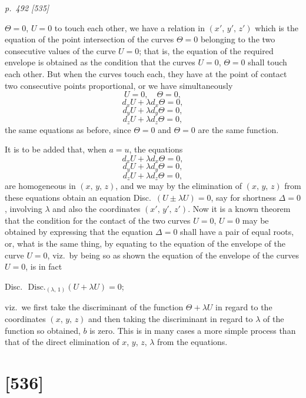 \documentclass[11pt,a4paper]{article}
\theoremstyle{plain}
\theoremstyle{definition}
\begin{document}
\clearpage

\bigskip
\textit{p.~492 [535]}
\smallskip

\noindent
$\Theta = 0$, $U = 0$ to touch each other, we have a relation in $(x',\,y',\,z')$ which is the equation
of the point intersection of the curves $\Theta = 0$ belonging to the two consecutive values
of the curve $U = 0$; that is, the equation of the required envelope is obtained as the
condition that the curves $U = 0$, $\Theta = 0$ shall touch each other. But when the curves
touch each, they have at the point of contact two consecutive points proportional,
or we have simultaneously
\[
U = 0, \quad \Theta = 0,
\]
\[
d_x U + \lambda d_x \Theta = 0,
\]
\[
d_y U + \lambda d_y \Theta = 0,
\]
\[
d_z U + \lambda d_z \Theta = 0,
\]
the same equations as before, since $\Theta = 0$ and $\Theta = 0$ are the same function.

It is to be added that, when $a = u$, the equations
\[
d_x U + \lambda d_x \Theta = 0,
\]
\[
d_y U + \lambda d_y \Theta = 0,
\]
\[
d_z U + \lambda d_z \Theta = 0,
\]
are homogeneous in $(x,\,y,\,z)$, and we may by the elimination of $(x,\,y,\,z)$ from these
equations obtain an equation Disc.\ $(U \pm \lambda U) = 0$, say for shortness $\Delta = 0$, involving $\lambda$
and also the coordinates $(x',\,y',\,z')$. Now it is a known theorem that the condition for
the contact of the two curves $U = 0$, $U = 0$ may be obtained by expressing that the
equation $\Delta = 0$ shall have a pair of equal roots, or, what is the same thing, by equating
to the equation of the envelope of the curve $U = 0$, viz.\ by being so as shown the
equation of the envelope of the curves $U = 0$, is in fact

Disc.\ $\,\text{Disc.}_{(\lambda,\,1)}(U + \lambda U) = 0$;

viz.\ we first take the discriminant of the function $\Theta + \lambda U$ in regard to the coordinates
$(x,\,y,\,z)$ and then taking the discriminant in regard to $\lambda$ of the function so obtained, $b$ is zero. This is in many cases a more simple process than that of the direct
elimination of $x$, $y$, $z$, $\lambda$ from the equations.

\clearpage

\section{[536]}
\end{document}

